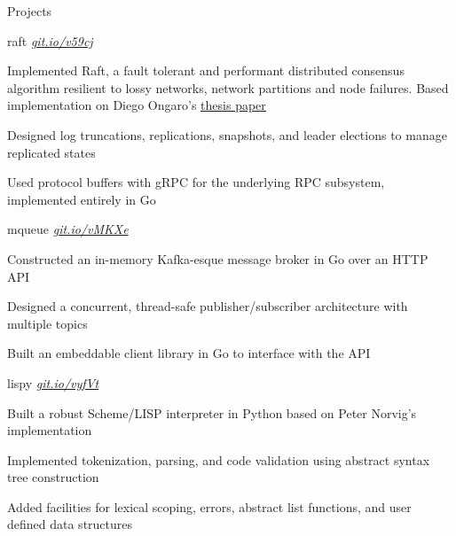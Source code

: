 \documentclass{resume} %
\begin{document}
\begin{rSection}{Projects}
  
  \begin{rSubsection}{raft}
	  {\em {\href{http://github.com/ridwanmsharif/raft}
		    {git.io/v59cj}}}
	  {}

    \item Implemented Raft, a fault tolerant and performant distributed
      consensus algorithm resilient to lossy networks, network partitions and node failures.
      Based implementation on Diego Ongaro's
      \href{https://raft.github.io/raft.pdf}{\underline{thesis paper}}
    \item Designed log truncations, replications, snapshots, and leader
      elections to manage replicated states
    \item Used protocol buffers with gRPC for the underlying RPC subsystem,
      implemented entirely in Go
      
  \end{rSubsection}

  \begin{rSubsection}{mqueue}
	  {\em {\href{http://github.com/ridwanmsharif/mqueue}
		    {git.io/vMKXe}}}
	  {}

    \item Constructed an in-memory Kafka-esque message broker in Go over an HTTP API
    \item Designed a concurrent, thread-safe publisher/subscriber architecture
      with multiple topics
    \item Built an embeddable client library in Go to interface with the API
        
  \end{rSubsection}

  \begin{rSubsection}{lispy}
	  {\em {\href{http://github.com/ridwanmsharif/lispy}
		    {git.io/vyfVt}}}
	  {}

    \item Built a robust Scheme/LISP interpreter in Python based on Peter
      Norvig's implementation
    \item Implemented tokenization, parsing, and code validation using abstract
      syntax tree construction
    \item Added facilities for lexical scoping, errors, abstract list
      functions, and user defined data structures
  \end{rSubsection}


\end{rSection}
\end{document}
